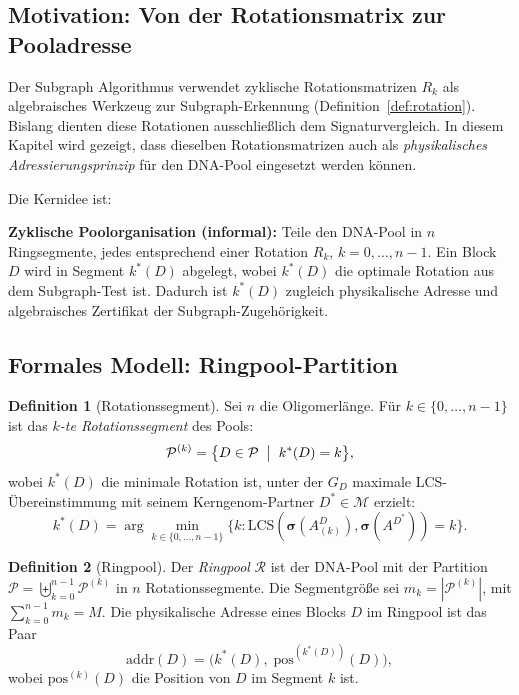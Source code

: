 ﻿\documentclass[a4paper,12pt]{article}
\theoremstyle{definition}
\newtheorem{definition}{Definition}[section]
\theoremstyle{plain}
\begin{document}
\subsection{Motivation: Von der Rotationsmatrix zur Pooladresse}
\label{ssec:ringpool_motivation}

Der Subgraph Algorithmus verwendet zyklische Rotationsmatrizen $R_k$
als algebraisches Werkzeug zur Subgraph-Erkennung
(Definition~\ref{def:rotation}).  Bislang dienten diese Rotationen
ausschließlich dem Signaturvergleich.  In diesem Kapitel wird gezeigt,
dass dieselben Rotationsmatrizen auch als \emph{physikalisches
Adressierungsprinzip} für den DNA-Pool eingesetzt werden können.

Die Kernidee ist:

\begin{mdframed}[nobreak=true]
  \textbf{Zyklische Poolorganisation (informal):} Teile den DNA-Pool
  in $n$ Ringsegmente, jedes entsprechend einer Rotation $R_k$, $k = 0,\ldots,n-1$.
  Ein Block $D$ wird in Segment $k^*(D)$ abgelegt, wobei $k^*(D)$ die
  optimale Rotation aus dem Subgraph-Test ist.  Dadurch ist $k^*(D)$
  zugleich physikalische Adresse und algebraisches Zertifikat der
  Subgraph-Zugehörigkeit.
\end{mdframed}

\subsection{Formales Modell: Ringpool-Partition}
\label{ssec:ringpool_modell}

\begin{definition}[Rotationssegment]
\label{def:rotationssegment}
  Sei $n$ die Oligomerlänge.  Für $k \in \{0, \ldots, n-1\}$ ist das
  \emph{$k$-te Rotationssegment} des Pools:
  \[
    \mathcal{P}^{(k)} = \bigl\{D \in \mathcal{P} \;\bigm|\;
      k^*(D) = k \bigr\},
  \]
  wobei $k^*(D)$ die minimale Rotation ist, unter der $G_D$ maximale
  LCS-Übereinstimmung mit seinem Kerngenom-Partner $D^* \in \mathcal{M}$
  erzielt:
  \[
    k^*(D) = \arg\min_{k \in \{0,\ldots,n-1\}}
    \bigl\{k : \mathrm{LCS}\!\left(\boldsymbol{\sigma}(A^D_{(k)}),
    \boldsymbol{\sigma}(A^{D^*})\right) = k\bigr\}.
  \]
\end{definition}

\begin{definition}[Ringpool]
\label{def:ringpool}
  Der \emph{Ringpool} $\mathcal{R}$ ist der DNA-Pool mit der Partition
  $\mathcal{P} = \biguplus_{k=0}^{n-1} \mathcal{P}^{(k)}$ in
  $n$ Rotationssegmente.  Die Segmentgröße sei
  $m_k = |\mathcal{P}^{(k)}|$, mit $\sum_{k=0}^{n-1} m_k = M$.
  Die physikalische Adresse eines Blocks $D$ im Ringpool ist das Paar
  \[
    \mathrm{addr}(D) = \bigl(k^*(D),\; \mathrm{pos}^{(k^*(D))}(D)\bigr),
  \]
  wobei $\mathrm{pos}^{(k)}(D)$ die Position von $D$ im Segment $k$ ist.
\end{definition}
\end{document}
